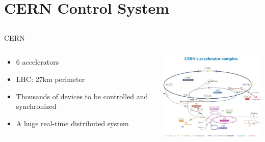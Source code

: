 \documentclass[compress,red]{beamer}
\begin{document}
\section{CERN Control System}
\subsection{}
\begin{frame}{CERN}

\begin{columns}[c]
    \begin{center}

      \begin{itemize}
	\item 6 accelerators
	\item LHC: 27km perimeter
	\item Thousands of devices to be controlled and synchronized
	\item A huge real-time distributed system
      \end{itemize}

    \end{center}
    \begin{center}
      \includegraphics[width=6.5cm]{applications/CERN/accelerators.pdf}
    \end{center}
\end{columns}

\end{frame}
\end{document}
